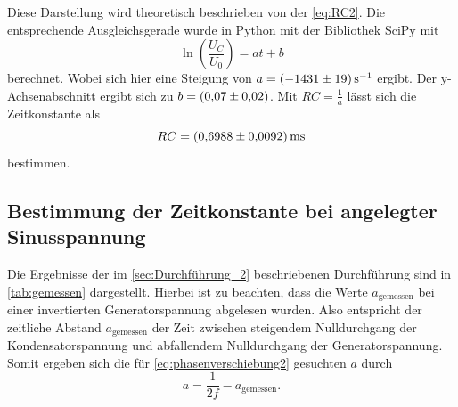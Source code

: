 Diese Darstellung wird theoretisch beschrieben von der \autoref{eq:RC2}.
Die entsprechende Ausgleichsgerade wurde in Python mit der Bibliothek SciPy\cite{scipy} mit
\begin{equation}
    \ln \left( \frac{U_C}{U_0} \right)=at+b
\end{equation}
berechnet.
Wobei sich hier eine Steigung von $a = \SI{-1431+-19}{\second}^{-1}$ ergibt.
Der y-Achsenabschnitt ergibt sich zu $b = \SI{0.07+-0.02}{}$.
Mit $RC=\frac{1}{a}$ lässt sich die Zeitkonstante als 
\begin{equation}
    RC = \SI{0.6988+-0.0092}{\milli\second}
\end{equation}
bestimmen.

\subsection{Bestimmung der Zeitkonstante bei angelegter Sinusspannung}
\label{sec:Auswertung_Sinusspannung}

Die Ergebnisse der im \autoref{sec:Durchführung_2} beschriebenen Durchführung sind in \autoref{tab:gemessen} dargestellt. Hierbei ist zu beachten, dass die Werte $a_{\text{gemessen}}$ bei einer invertierten Generatorspannung abgelesen wurden. Also entspricht der zeitliche Abstand $a_{\text{gemessen}}$ der Zeit zwischen steigendem Nulldurchgang der Kondensatorspannung und abfallendem Nulldurchgang der Generatorspannung.
Somit ergeben sich die für \autoref{eq:phasenverschiebung2} gesuchten $a$ durch
\begin{equation}
    a = \frac{1}{2f} - a_{\text{gemessen}}.
\end{equation}

